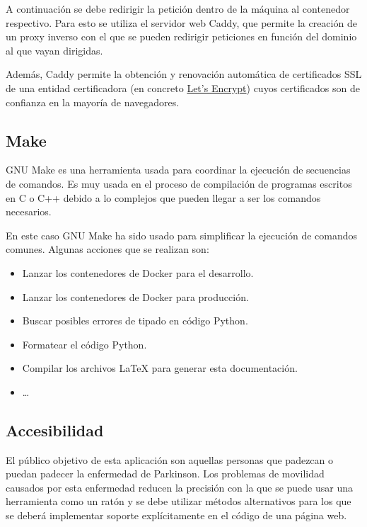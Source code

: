 A continuación se debe redirigir la petición dentro de la máquina al contenedor
respectivo. Para esto se utiliza el servidor web Caddy, que permite la creación
de un proxy inverso con el que se pueden redirigir peticiones en función del
dominio al que vayan dirigidas.

Además, Caddy permite la obtención y renovación automática de certificados SSL
de una entidad certificadora (en concreto \href{https://letsencrypt.org/}{Let's
Encrypt}) cuyos certificados son de confianza en la mayoría de navegadores.

\subsection{Make}

GNU Make es una herramienta usada para coordinar la ejecución de secuencias de
comandos. Es muy usada en el proceso de compilación de programas escritos en C o
C++ debido a lo complejos que pueden llegar a ser los comandos necesarios.

En este caso GNU Make ha sido usado para simplificar la ejecución de comandos
comunes. Algunas acciones que se realizan son:

\begin{itemize}
    \item Lanzar los contenedores de Docker para el desarrollo.
    \item Lanzar los contenedores de Docker para producción.
    \item Buscar posibles errores de tipado en código Python.
    \item Formatear el código Python.
    \item Compilar los archivos \LaTeX{} para generar esta documentación.
    \item \dots
\end{itemize}

\subsection{Accesibilidad}

El público objetivo de esta aplicación son aquellas personas que padezcan o
puedan padecer la enfermedad de Parkinson. Los problemas de movilidad causados
por esta enfermedad reducen la precisión con la que se puede usar una
herramienta como un ratón y se debe utilizar métodos alternativos para los que
se deberá implementar soporte explícitamente en el código de una página web.

